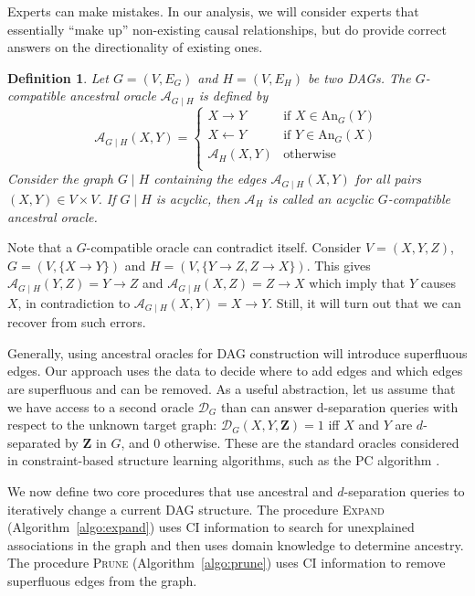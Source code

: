 \documentclass[accepted]{uai2025} %
\newtheorem{definition}{Definition}
\begin{document}
Experts can make mistakes. In our analysis, we will consider experts that
essentially ``make up'' non-existing causal relationships, but do provide 
correct answers on the directionality of existing ones. 

\begin{definition}
Let $G=(V,E_G)$ and $H=(V,E_H)$ be two DAGs. 
The \emph{$G$-compatible ancestral oracle} $\mathcal{A}_{G\mid H}$ is defined by
$$\mathcal{A}_{G\mid H}(X,Y)=\begin{cases}
 X \to Y & \textrm{if } X \in \textrm{An}_G(Y) \\
 X \gets Y & \textrm{if } Y \in \textrm{An}_G(X) \\
 \mathcal{A}_{H}(X,Y) & \textrm{otherwise} \\
\end{cases}$$
Consider the graph $G\mid H$ containing the edges $ \mathcal{A}_{G\mid H}(X,Y)$ for all 
pairs $(X, Y) \in V \times V$.   
If $G\mid H$ is acyclic, then 
$\mathcal{A}_H$ is called an \emph{acyclic $G$-compatible ancestral oracle}.
\end{definition}

Note that a $G$-compatible oracle can contradict itself. Consider 
$V=(X,Y,Z)$, $G=(V,\{X \to Y\})$ and $H=(V,\{Y \to Z, Z \to X\})$.
This gives $\mathcal{A}_{G \mid H}(Y,Z) = Y \to Z$  
 and $\mathcal{A}_{G \mid H}(X,Z) = Z \to X$ which imply that $Y$ causes $X$, 
in contradiction to
 $\mathcal{A}_{G \mid H}(X,Y) = X \to Y$. Still, it will turn out that we can recover
from such errors.

Generally, using ancestral oracles for DAG construction will introduce superfluous edges.
Our approach uses the data to decide where to add edges and which edges 
are superfluous and can be removed.
As a useful abstraction, let us assume that we
have access to a second oracle $\mathcal{D}_G$ than can answer d-separation
queries with respect to the unknown target graph:
$\mathcal{D}_G(X,Y,\mathbf{Z})=1$ iff $X$ and $Y$ are $d$-separated by $\mathbf{Z}$ in 
$G$, and $0$ otherwise. These are the standard oracles considered in constraint-based structure
learning algorithms, such as the PC algorithm \citep{Spirtes2001}. 

We now define two core procedures that use ancestral and $d$-separation queries
to iteratively change a current DAG structure. The procedure 
\textsc{Expand} (Algorithm~\ref{algo:expand}) uses CI  
information to search for unexplained associations in the graph and 
then uses domain knowledge to determine ancestry. The 
procedure \textsc{Prune} (Algorithm~\ref{algo:prune}) uses
CI information to remove superfluous edges from the
graph.
\end{document}
